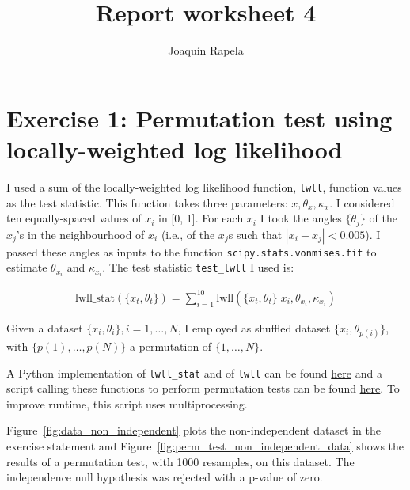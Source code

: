 \documentclass[12pt]{article}
\title{Report worksheet 4}
\author{Joaqu\'{i}n Rapela}
\begin{document}
\maketitle

\section*{Exercise 1: Permutation test using locally-weighted log likelihood}

I used a sum of the locally-weighted log likelihood function, \texttt{lwll},
function values as the test statistic. This function takes three parameters:
$x, \theta_x, \kappa_x$. I considered ten equally-spaced values of $x_i$ in [0,
1]. For each $x_i$ I took the angles $\{\theta_j\}$ of the $x_j$'s in the
neighbourhood of $x_i$ (i.e., of the $x_j$s such that $|x_i-x_j|<0.005$). I
passed these angles as inputs to the function \texttt{scipy.stats.vonmises.fit}
to estimate $\theta_{x_i}$ and $\kappa_{x_i}$. The test statistic
\texttt{test\_lwll} I used is:

\begin{align}
    \text{lwll\_stat}(\{x_t,\theta_t\})=\sum_{i=1}^{10}\text{lwll}\left(\{x_t,\theta_t\}|x_i,\theta_{x_i},\kappa_{x_i}\right)
\end{align}

Given a dataset $\{x_i, \theta_i\}, i=1,\ldots,N$, I employed as shuffled dataset
$\{x_i, \theta_{p(i)}\}$, with $\{p(1),\ldots,p(N)\}$ a permutation of
$\{1,\ldots,N\}$.

A Python implementation of \texttt{lwll\_stat} and of \texttt{lwll} can be
found
\href{https://github.com/joacorapela/neuroinformatics23/blob/master/worksheets/ws4/mySolution/code/scripts/utils.py}{here}
and a script calling these functions to perform permutation tests can be found
\href{https://github.com/joacorapela/neuroinformatics23/blob/master/worksheets/ws4/mySolution/code/scripts/doPermutationTestLWLL.py}{here}.
To improve runtime, this script uses multiprocessing.

Figure~\ref{fig:data_non_independent} plots the non-independent 
dataset in the exercise statement and
Figure~\ref{fig:perm_test_non_independent_data} shows the results of a
permutation test, with 1000 resamples, on this dataset. The independence null
hypothesis was rejected with a p-value of zero.
\end{document}
